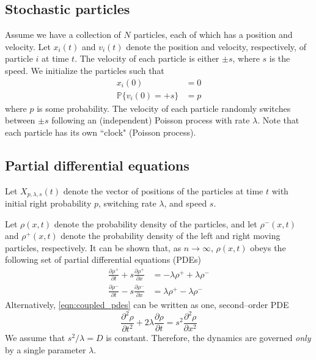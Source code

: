 \documentclass[prl, reprint, final]{revtex4-1}
\begin{document}
\subsection{Stochastic particles}

Assume we have a collection of $N$ particles, each of which has a position and velocity. 
%
Let $x_i(t)$ and $v_i(t)$ denote the position and velocity, respectively, of particle $i$ at time $t$.
%
The velocity of each particle is either $\pm s$, where $s$ is the speed. 
%
We initialize the particles such that
\begin{equation}
\begin{aligned}
x_i(0) & = 0 \\
\mathbb{P} \{ v_i(0) = +s \} & = p
\end{aligned}
\end{equation}
where $p$ is some probability.
%
The velocity of each particle randomly switches between $\pm s$ following an (independent) Poisson process with rate $\lambda$.
%
Note that each particle has its own ``clock" (Poisson process).

\subsection{Partial differential equations}

Let $X_{p, \lambda, s}(t)$ denote the vector of positions of the particles at time $t$ with initial right probability $p$, switching rate $\lambda$, and speed $s$.

Let $\rho(x, t)$ denote the probability density of the particles, and let $\rho^-(x, t)$ and $\rho^+(x, t)$ denote the probability density of the left and right moving particles, respectively.
%
It can be shown that, as $n \rightarrow \infty$, $\rho(x, t)$ obeys the following set of partial differential equations (PDEs)
\begin{equation} \label{eqn:coupled_pdes}
\begin{aligned}
\frac{\partial \rho^+}{\partial t} + s \frac{\partial \rho^+}{\partial x} & = -\lambda \rho^+ +\lambda \rho^- \\
\frac{\partial \rho^-}{\partial t} - s \frac{\partial \rho^-}{\partial x} & = \lambda \rho^+ -\lambda \rho^- 
\end{aligned}
\end{equation}
%
Alternatively, \eqref{eqn:coupled_pdes} can be written as one, second--order PDE
\begin{equation} \label{eq:second_order_pde}
\frac{\partial^2 \rho}{\partial t^2} + 2 \lambda \frac{\partial \rho}{\partial t} = s^2 \frac{\partial ^2 \rho}{\partial x^2}
\end{equation}
%
We assume that $s^2/\lambda = D$ is constant.
%
Therefore, the dynamics are governed {\em only} by a single parameter $\lambda$.
\end{document}
